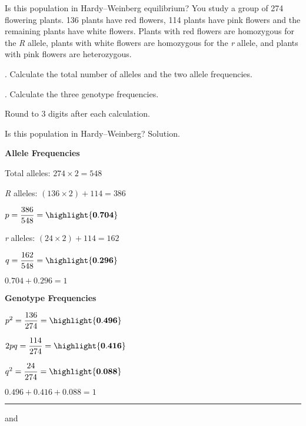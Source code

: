 \documentclass[t]{beamer}
\begin{document}
%
\begin{frame}{Is this population in Hardy--Weinberg equilibrium?}
	\hangpara You study a group of 274 flowering plants.  136 plants have red flowers, 114 plants have pink flowers and the remaining plants have white flowers. Plants with red flowers are homozygous for the \emph{R} allele, plants with white flowers are homozygous for the \emph{r} allele, and plants with pink flowers are heterozygous.

	. Calculate the total number of alleles and the two allele frequencies.

	. Calculate the three genotype frequencies.

	\hangpara Round to 3 digits after each calculation.
\end{frame}
%
{
\begin{frame}{Is this population in Hardy--Weinberg? Solution.}
\begin{multicols}{2}

	\hangpara \textbf{Allele Frequencies}
	
	\hangpara Total alleles: $274 \times 2 = 548$
	
	\hangpara \emph{R} alleles: $(136 \times 2) + 114 = 386$
	
	\hangpara $p = \dfrac{386}{548} = \highlight{\mathbf{0.704}}$

	\hangpara \emph{r} alleles: $(24 \times 2) + 114 = 162$ 

	\hangpara $q = \dfrac{162}{548} = \highlight{\mathbf{0.296}}$
	
	\hangpara $0.704 + 0.296 = 1$ \checkmark

\columnbreak

	\hangpara \textbf{Genotype Frequencies}
	
	\hangpara $p^2 = \dfrac{136}{274} = \highlight{\mathbf{0.496}}$ 

	\hangpara $2pq = \dfrac{114}{274} = \highlight{\mathbf{0.416}}$

	\hangpara $q^2 = \dfrac{24}{274} = \highlight{\mathbf{0.088}}$

	\hangpara $0.496 + 0.416 + 0.088 = 1$ \checkmark
	
	\rule{0.4\textwidth}{0.1pt}\vspace{-0.5\baselineskip}
	
	\hangpara {} and
	

\end{multicols}
\end{frame}
}
%
\end{document}
